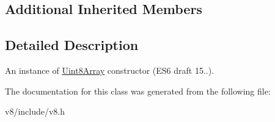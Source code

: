 \subsection*{Additional Inherited Members}


\subsection{Detailed Description}
An instance of \mbox{\hyperlink{classv8_1_1Uint8Array}{Uint8\+Array}} constructor (E\+S6 draft 15..). 

The documentation for this class was generated from the following file\+:\begin{DoxyCompactItemize}
\item 
v8/include/v8.\+h\end{DoxyCompactItemize}
